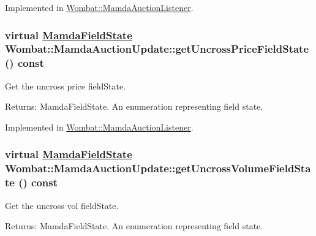 Implemented in \hyperlink{classWombat_1_1MamdaAuctionListener_65c25c4e3840fd5a70fff6495cccc0c4}{Wombat::Mamda\-Auction\-Listener}.\hypertarget{classWombat_1_1MamdaAuctionUpdate_19ed1cff3705e0f124c4a6895ad4a43d}{
\subsubsection[getUncrossPriceFieldState]{\setlength{\rightskip}{0pt plus 5cm}virtual \hyperlink{namespaceWombat_93aac974f2ab713554fd12a1fa3b7d2a}{Mamda\-Field\-State} Wombat::Mamda\-Auction\-Update::get\-Uncross\-Price\-Field\-State () const}}
\label{classWombat_1_1MamdaAuctionUpdate_19ed1cff3705e0f124c4a6895ad4a43d}


Get the uncross price field\-State. 

\begin{Desc}
\item[Returns:]Mamda\-Field\-State. An enumeration representing field state. \end{Desc}


Implemented in \hyperlink{classWombat_1_1MamdaAuctionListener_be7081fdcfdb4f70ad917fe12b6ad2ce}{Wombat::Mamda\-Auction\-Listener}.\hypertarget{classWombat_1_1MamdaAuctionUpdate_6ac08f0a65e4b0f68ac7e61e4ed84884}{
\subsubsection[getUncrossVolumeFieldState]{\setlength{\rightskip}{0pt plus 5cm}virtual \hyperlink{namespaceWombat_93aac974f2ab713554fd12a1fa3b7d2a}{Mamda\-Field\-State} Wombat::Mamda\-Auction\-Update::get\-Uncross\-Volume\-Field\-State () const}}
\label{classWombat_1_1MamdaAuctionUpdate_6ac08f0a65e4b0f68ac7e61e4ed84884}


Get the uncross vol field\-State. 

\begin{Desc}
\item[Returns:]Mamda\-Field\-State. An enumeration representing field state. \end{Desc}



